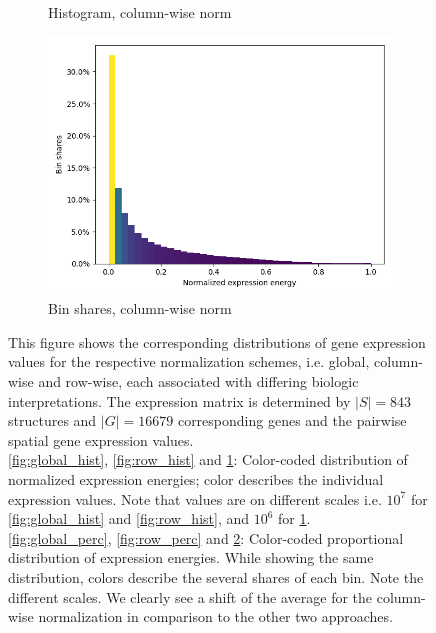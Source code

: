 \documentclass[]{article}
\begin{document}
\begin{figure}
\begin{subfigure}{.45\textwidth}
		\caption{Histogram, column-wise norm}
		\label{fig:col_hist}
	\end{subfigure}
	\begin{subfigure}{.45\textwidth}
		\centering
		\includegraphics[width=.9\linewidth]{plotted_figures/column_percent_ge_data_histo.png}
		\caption{Bin shares, column-wise norm}
		\label{fig:col_perc}
	\end{subfigure}

	\caption[Distributions of gene expression values for the respective normalization schemes]{This figure shows the corresponding distributions of gene expression values for the respective normalization schemes, i.e. global, column-wise and row-wise, each associated with differing biologic interpretations. The expression matrix is determined by $|S|=843$ structures and $|G|=16679$ corresponding genes and the pairwise spatial gene expression values.\\ \ref{fig:global_hist}, \ref{fig:row_hist} and \ref{fig:col_hist}: Color-coded distribution of normalized expression energies; color describes the individual expression values. Note that values are on different scales i.e. $10^7$ for \ref{fig:global_hist} and \ref{fig:row_hist}, and $10^6$ for \ref{fig:col_hist}.\\ 
	\ref{fig:global_perc}, \ref{fig:row_perc} and \ref{fig:col_perc}: 
	Color-coded proportional distribution of expression energies. While showing the same distribution, colors describe the several shares of each bin. Note the different scales. We clearly see a shift of the average for the column-wise normalization in comparison to the other two approaches.}
	\label{fig:ge_hists}
\end{figure}
\end{document}
